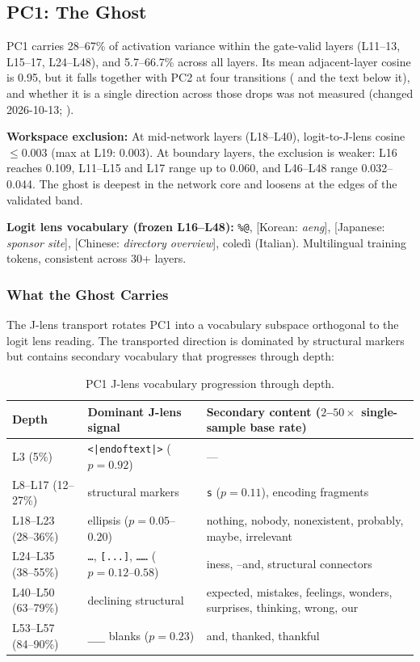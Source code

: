 \documentclass[11pt,a4paper]{article}
\begin{document}
\subsection{PC1: The Ghost}

PC1 carries 28--67\% of activation variance within the gate-valid layers (L11--13, L15--17, L24--L48), and 5.7--66.7\% across all layers. Its mean adjacent-layer cosine is 0.95, but it falls together with PC2 at four transitions ( and the text below it), and whether it is a single direction across those drops was not measured (changed 2026-10-13; ).

\textbf{Workspace exclusion:} At mid-network layers (L18--L40), logit-to-J-lens cosine $\leq 0.003$ (max at L19: 0.003). At boundary layers, the exclusion is weaker: L16 reaches 0.109, L11--L15 and L17 range up to 0.060, and L46--L48 range 0.032--0.044. The ghost is deepest in the network core and loosens at the edges of the validated band.

\textbf{Logit lens vocabulary (frozen L16--L48):} \texttt{\%@}, [Korean: \textit{aeng}], [Japanese: \textit{sponsor site}], [Chinese: \textit{directory overview}], coled\`{i} (Italian). Multilingual training tokens, consistent across 30+ layers.

\subsubsection{What the Ghost Carries}
\label{sec:ghost-carries}

The J-lens transport rotates PC1 into a vocabulary subspace orthogonal to the logit lens reading. The transported direction is dominated by structural markers but contains secondary vocabulary that progresses through depth:

\begin{table}[H]
\centering
\caption{PC1 J-lens vocabulary progression through depth.}
\label{tab:ghost-vocab}
\small
\begin{tabular}{p{2.3cm}p{5cm}p{6cm}}
\toprule
Depth & Dominant J-lens signal & Secondary content ($2$--$50\times$ single-sample base rate) \\
\midrule
L3 (5\%) & \texttt{<|endoftext|>} ($p = 0.92$) & --- \\
L8--L17 (12--27\%) & structural markers & \texttt{s} ($p = 0.11$), encoding fragments \\
L18--L23 (28--36\%) & ellipsis ($p = 0.05$--$0.20$) & nothing, nobody, nonexistent, probably, maybe, irrelevant \\
L24--L35 (38--55\%) & \texttt{\ldots}, \texttt{[...]}, \texttt{\ldots\ldots} ($p = 0.12$--$0.58$) & iness, --and, structural connectors \\
L40--L50 (63--79\%) & declining structural & expected, mistakes, feelings, wonders, surprises, thinking, wrong, our \\
L53--L57 (84--90\%) & \texttt{\_\_\_} blanks ($p = 0.23$) & and, thanked, thankful \\
\bottomrule
\end{tabular}
\end{table}
\end{document}
